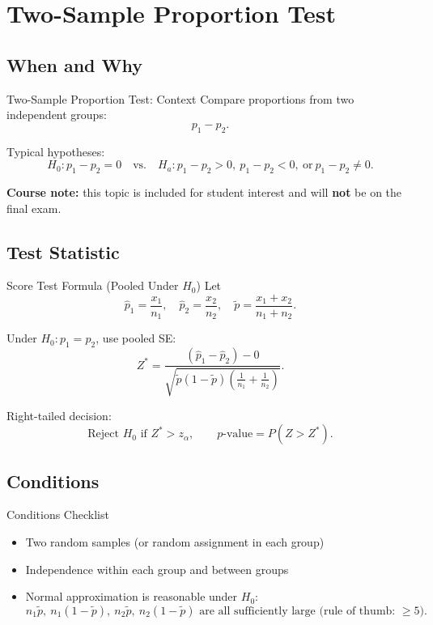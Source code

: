 \documentclass[aspectratio=169]{beamer}
\begin{document}
\section{Two-Sample Proportion Test}

\subsection{When and Why}
\begin{frame}{Two-Sample Proportion Test: Context}
  Compare proportions from two independent groups:
  \[
    p_1- p_2.
  \]

  Typical hypotheses:
  \[
    H_0:p_1-p_2=0
    \quad\text{vs.}\quad
    H_a:p_1-p_2>0,\ p_1-p_2<0,\ \text{or}\ p_1-p_2\ne 0.
  \]

  \vspace{1mm}
  \textbf{Course note:} this topic is included for student interest and will \textbf{not} be on the final exam.
\end{frame}

\subsection{Test Statistic}
\begin{frame}{Score Test Formula (Pooled Under \(H_0\))}
  Let
  \[
    \hat p_1=\frac{x_1}{n_1},\quad
    \hat p_2=\frac{x_2}{n_2},\quad
    \tilde p=\frac{x_1+x_2}{n_1+n_2}.
  \]

  Under \(H_0:p_1=p_2\), use pooled SE:
  \[
    Z^*=\frac{(\hat p_1-\hat p_2)-0}{\sqrt{\tilde p(1-\tilde p)\left(\frac1{n_1}+\frac1{n_2}\right)}}.
  \]

  Right-tailed decision:
  \[
    \text{Reject }H_0\text{ if }Z^*>z_{\alpha},
    \qquad
    p\text{-value}=P(Z>Z^*).
  \]
\end{frame}

\subsection{Conditions}
\begin{frame}{Conditions Checklist}
  \begin{itemize}
    \item Two random samples (or random assignment in each group)
    \item Independence within each group and between groups
    \item Normal approximation is reasonable under \(H_0\):
    \[
      n_1\tilde p,\ n_1(1-\tilde p),\ n_2\tilde p,\ n_2(1-\tilde p)
      \text{ are all sufficiently large (rule of thumb: }\ge 5\text{)}.
    \]
  \end{itemize}
\end{frame}
\end{document}
